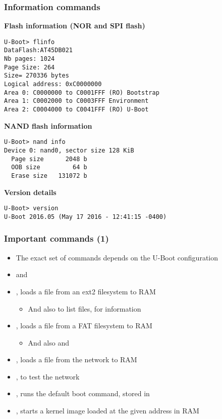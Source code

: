\begin{frame}[fragile]
  \frametitle{Information commands}
\scriptsize
  {\bf Flash information (NOR and SPI flash)}
\begin{verbatim}
U-Boot> flinfo
DataFlash:AT45DB021
Nb pages: 1024
Page Size: 264
Size= 270336 bytes
Logical address: 0xC0000000
Area 0: C0000000 to C0001FFF (RO) Bootstrap
Area 1: C0002000 to C0003FFF Environment
Area 2: C0004000 to C0041FFF (RO) U-Boot
\end{verbatim}
  {\bf NAND flash information}
\begin{verbatim}
U-Boot> nand info
Device 0: nand0, sector size 128 KiB
  Page size      2048 b
  OOB size         64 b
  Erase size   131072 b
\end{verbatim}
  {\bf Version details}
\begin{verbatim}
U-Boot> version
U-Boot 2016.05 (May 17 2016 - 12:41:15 -0400)
\end{verbatim}
\end{frame}

\begin{frame}
  \frametitle{Important commands (1)}
  \begin{itemize}
  \item The exact set of commands depends on the U-Boot configuration
  \item {} and 
  \item {}, loads a file from an ext2 filesystem to RAM
    \begin{itemize}
    \item And also  to list files,  for
      information
    \end{itemize}
  \item {}, loads a file from a FAT filesystem to RAM
    \begin{itemize}
    \item And also  and 
    \end{itemize}
  \item {}, loads a file from the network to RAM
  \item {}, to test the network
  \item {}, runs the default boot command, stored in
  \item {}, starts a kernel image loaded at the
    given address in RAM
  \end{itemize}
\end{frame}

